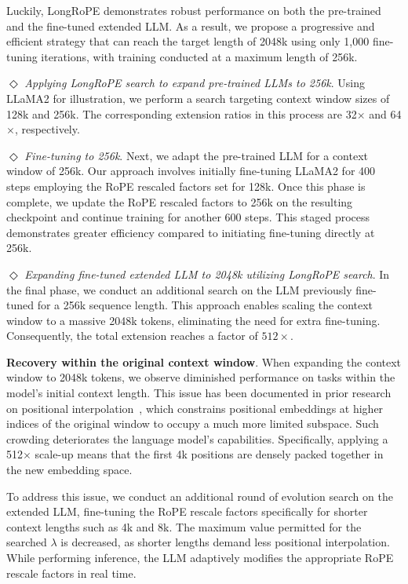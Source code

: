 Luckily, LongRoPE demonstrates robust performance on both the pre-trained and the fine-tuned extended LLM. As a result, we propose a progressive and efficient strategy that can reach the target length of 2048k using only 1,000 fine-tuning iterations, with training conducted at a maximum length of 256k.

$\Diamond$ \textit{Applying LongRoPE search to expand pre-trained LLMs to 256k}. Using LLaMA2 for illustration, we perform a search targeting context window sizes of 128k and 256k. The corresponding extension ratios in this process are 32$\times$ and 64$\times$, respectively.

$\Diamond$ \textit{Fine-tuning to 256k}. Next, we adapt the pre-trained LLM for a context window of 256k. Our approach involves initially fine-tuning LLaMA2 for 400 steps employing the RoPE rescaled factors set for 128k. Once this phase is complete, we update the RoPE rescaled factors to 256k on the resulting checkpoint and continue training for another 600 steps. This staged process demonstrates greater efficiency compared to initiating fine-tuning directly at 256k.

$\Diamond$ \textit{Expanding fine-tuned extended LLM to 2048k utilizing LongRoPE search}. In the final phase, we conduct an additional search on the LLM previously fine-tuned for a 256k sequence length. This approach enables scaling the context window to a massive 2048k tokens, eliminating the need for extra fine-tuning. Consequently, the total extension reaches a factor of $512\times$.

\textbf{Recovery within the original context window}.  When expanding the context window to 2048k tokens, we observe diminished performance on tasks within the model’s initial context length. This issue has been documented in prior research on positional interpolation~\cite{pi}, which constrains positional embeddings at higher indices of the original window to occupy a much more limited subspace. Such crowding deteriorates the language model’s capabilities. Specifically, applying a 512$\times$ scale-up means that the first 4k positions are densely packed together in the new embedding space.

To address this issue, we conduct an additional round of evolution search on the extended LLM, fine-tuning the RoPE rescale factors specifically for shorter context lengths such as 4k and 8k. The maximum value permitted for the searched $\lambda$ is decreased, as shorter lengths demand less positional interpolation. While performing inference, the LLM adaptively modifies the appropriate RoPE rescale factors in real time.

